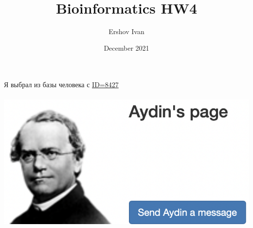 \documentclass[12pt]{article}
\title{Bioinformatics HW4}
\author{Ershov Ivan}
\date{December 2021}
\begin{document}
\maketitle
Я выбрал из базы человека с \href{https://opensnp.org/users/10161}{ID=8427}\\\\
\includegraphics[width=\textwidth]{images/person.png}\\\\
\newpage
\end{document}
